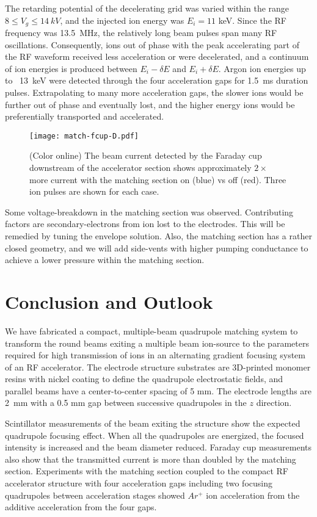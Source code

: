 \documentclass[%
 aip,
rsi,%
 amsmath,amssymb,
 reprint,%
]{revtex4-1}
\begin{document}
The retarding potential of the decelerating grid was varied within the range 
$8 \le V_g \le 14 \: kV$, and the injected ion energy was $E_i = 11$ keV.  Since the RF frequency was 13.5~MHz, the relatively long beam pulses span many RF oscillations. Consequently, ions out of phase with the peak accelerating part of the RF waveform received less acceleration or were decelerated, and a continuum of ion energies is produced between $E_i - \delta E$ and $E_i + \delta E$.  Argon ion energies up to ~13~keV were detected through the four acceleration gaps for 1.5~ms duration pulses. Extrapolating to many more acceleration gaps,  the slower ions would be further out of phase and eventually lost, and the higher energy ions would be preferentially transported and accelerated. 

\begin{figure}[ht!]
  \centering
  \texttt{[image: match-fcup-D.pdf]}
  \caption{(Color online) The beam current detected by the Faraday cup downstream of the accelerator section shows approximately $2\times$ more current with the matching section on (blue) vs off (red). Three ion pulses are shown for each case.}
  \label{fig:faraday-cup}
\end{figure}

Some voltage-breakdown in the matching section was observed.  Contributing factors are secondary-electrons from ion lost to the electrodes.  This will be remedied by tuning the envelope solution.  Also, the matching section has a rather closed geometry, and we will add side-vents with higher pumping conductance to achieve a lower pressure within the matching section.

\section{Conclusion and Outlook}

We have fabricated a compact, multiple-beam quadrupole matching system to transform the round beams exiting a multiple beam ion-source to the parameters required for high transmission of ions in an alternating gradient focusing system of an RF accelerator.  The electrode structure substrates are 3D-printed monomer resins with nickel coating to define the quadrupole electrostatic fields, and parallel beams have a center-to-center spacing of 5 mm.  The electrode lengths are 2~mm with a 0.5 mm gap between successive quadrupoles in the $z$ direction.  

Scintillator measurements of the beam exiting the structure show the expected quadrupole focusing effect. When all the quadrupoles are energized, the focused intensity is increased and the beam diameter reduced. Faraday cup measurements also show that the transmitted current is more than doubled by the matching section.  Experiments with the matching section coupled to the compact RF accelerator structure with four acceleration gaps including two focusing quadrupoles between acceleration stages showed $Ar^+$ ion acceleration from the additive acceleration from the four gaps.  
\end{document}
